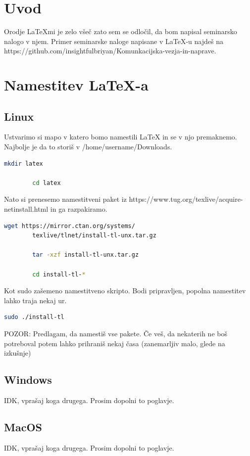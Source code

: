 \documentclass[12pt]{article}
\begin{document}
\newpage
\section{Uvod}
Orodje \LaTeX mi je zelo všeč zato sem se odločil, da bom napisal seminarsko nalogo v njem.
Primer seminarske naloge napisane v \LaTeX-u najdeš na https://github.com/insightfulbriyan/Komunkacijska-vezja-in-naprave.

\section{Namestitev \LaTeX-a}
    \subsection{Linux}
    Ustvarimo si mapo v katero bomo namestili \LaTeX{} in se v njo premaknemo. Najbolje je da to storiš v /home/username/Downloads.
    \begin{lstlisting}[language=bash]
        mkdir latex

        cd latex
    \end{lstlisting}

    Nato si prenesemo namestitveni paket iz https://www.tug.org/texlive/acquire-netinstall.html in ga razpakiramo.
    \begin{lstlisting}[language=bash]
        wget https://mirror.ctan.org/systems/
        texlive/tlnet/install-tl-unx.tar.gz

        tar -xzf install-tl-unx.tar.gz

        cd install-tl-*
    \end{lstlisting}

    Kot sudo zašemeno namestitveno skripto. Bodi pripravljen, popolna namestitev lahko traja nekaj ur. 
    \begin{lstlisting}[language=bash]
        sudo ./install-tl
    \end{lstlisting}
    POZOR:
    Predlagam, da namestiš vse pakete. Če veš, da nekaterih ne boš potreboval potem lahko prihraniš nekaj časa (zanemarljiv malo, glede na izkušnje)

    \subsection{Windows}
    IDK, vprašaj koga drugega. Prosim dopolni to poglavje.

    \subsection{MacOS}
    IDK, vprašaj koga drugega. Prosim dopolni to poglavje.
\end{document}
